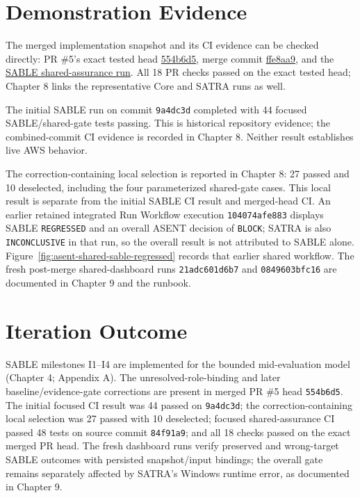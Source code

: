 \section{Demonstration Evidence}

\begin{sloppypar}
The merged implementation snapshot and its CI evidence can be checked directly: PR \#5's exact tested head \href{https://github.com/SheharyarAli-Dev/Working-POC/commit/554b6d51acca29f99c396c3040362015ee460262}{554b6d5}, merge commit \href{https://github.com/SheharyarAli-Dev/Working-POC/commit/ffe8aa91ca89702e5db65b8f7ff129aa72f761cc}{ffe8aa9}, and the \href{https://github.com/SheharyarAli-Dev/Working-POC/actions/runs/38260995657}{SABLE shared-assurance run}. All 18 PR checks passed on the exact tested head; Chapter 8 links the representative Core and SATRA runs as well.
\end{sloppypar}

The initial SABLE run on commit \texttt{9a4dc3d} completed with 44 focused SABLE/shared-gate tests passing. This is historical repository evidence; the combined-commit CI evidence is recorded in Chapter 8. Neither result establishes live AWS behavior.

\begin{sloppypar}
The correction-containing local selection is reported in Chapter 8: 27 passed and 10 deselected, including the four parameterized shared-gate cases. This local result is separate from the initial SABLE CI result and merged-head CI. An earlier retained integrated Run Workflow execution \texttt{104074afe883} displays SABLE \texttt{REGRESSED} and an overall ASENT decision of \texttt{BLOCK}; SATRA is also \texttt{INCONCLUSIVE} in that run, so the overall result is not attributed to SABLE alone. Figure~\ref{fig:asent-shared-sable-regressed} records that earlier shared workflow. The fresh post-merge shared-dashboard runs \texttt{21adc601d6b7} and \texttt{0849603bfc16} are documented in Chapter 9 and the runbook.
\end{sloppypar}




\section{Iteration Outcome}

SABLE milestones I1--I4 are implemented for the bounded mid-evaluation model (Chapter 4; Appendix A). The unresolved-role-binding and later baseline/evidence-gate corrections are present in merged PR \#5 head \texttt{554b6d5}. The initial focused CI result was 44 passed on \texttt{9a4dc3d}; the correction-containing local selection was 27 passed with 10 deselected; focused shared-assurance CI passed 48 tests on source commit \texttt{84f91a9}; and all 18 checks passed on the exact merged PR head. The fresh dashboard runs verify preserved and wrong-target SABLE outcomes with persisted snapshot/input bindings; the overall gate remains separately affected by SATRA's Windows runtime error, as documented in Chapter 9.
